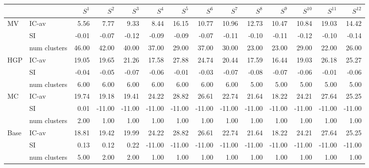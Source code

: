 \begin{tabular}{llrrrrrrrrrrrr}
\toprule
 &  & $S^{1}$ & $S^{2}$ & $S^{3}$ & $S^{4}$ & $S^{5}$ & $S^{6}$ & $S^{7}$ & $S^{8}$ & $S^{9}$ & $S^{10}$ & $S^{11}$ & $S^{12}$ \\
\midrule
\multirow[c]{3}{*}{MV} & IC-av & 5.56 & 7.77 & 9.33 & 8.44 & 16.15 & 10.77 & 10.96 & 12.73 & 10.47 & 10.84 & 19.03 & 14.42 \\
 & SI & -0.01 & -0.07 & -0.12 & -0.09 & -0.09 & -0.07 & -0.11 & -0.10 & -0.11 & -0.12 & -0.10 & -0.14 \\
 & num clusters & 46.00 & 42.00 & 40.00 & 37.00 & 29.00 & 37.00 & 30.00 & 23.00 & 23.00 & 29.00 & 22.00 & 26.00 \\
\multirow[c]{3}{*}{HGP} & IC-av & 19.05 & 19.65 & 21.26 & 17.58 & 27.88 & 24.74 & 20.44 & 17.59 & 16.44 & 19.03 & 26.18 & 25.27 \\
 & SI & -0.04 & -0.05 & -0.07 & -0.06 & -0.01 & -0.03 & -0.07 & -0.08 & -0.07 & -0.06 & -0.01 & -0.06 \\
 & num clusters & 6.00 & 6.00 & 6.00 & 6.00 & 6.00 & 6.00 & 6.00 & 5.00 & 5.00 & 5.00 & 5.00 & 5.00 \\
\multirow[c]{3}{*}{MC} & IC-av & 19.74 & 19.18 & 19.41 & 24.22 & 28.82 & 26.61 & 22.74 & 21.64 & 18.22 & 24.21 & 27.64 & 25.25 \\
 & SI & 0.01 & -11.00 & -11.00 & -11.00 & -11.00 & -11.00 & -11.00 & -11.00 & -11.00 & -11.00 & -11.00 & -11.00 \\
 & num clusters & 2.00 & 1.00 & 1.00 & 1.00 & 1.00 & 1.00 & 1.00 & 1.00 & 1.00 & 1.00 & 1.00 & 1.00 \\
\multirow[c]{3}{*}{Base} & IC-av & 18.81 & 19.42 & 19.99 & 24.22 & 28.82 & 26.61 & 22.74 & 21.64 & 18.22 & 24.21 & 27.64 & 25.25 \\
 & SI & 0.13 & 0.12 & 0.22 & -11.00 & -11.00 & -11.00 & -11.00 & -11.00 & -11.00 & -11.00 & -11.00 & -11.00 \\
 & num clusters & 5.00 & 2.00 & 2.00 & 1.00 & 1.00 & 1.00 & 1.00 & 1.00 & 1.00 & 1.00 & 1.00 & 1.00 \\
\bottomrule
\end{tabular}
